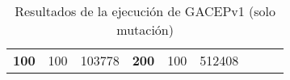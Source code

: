 \begin{table}[H]
\begin{tabular}{|ccrccrccr}
\multicolumn{1}{|c|}{\multirow{-39}{*}{\cellcolor[HTML]{FFFFC7}\textbf{100}}} & \multicolumn{1}{c|}{\multirow{-9}{*}{\cellcolor[HTML]{DDFDFF}100}} & \multicolumn{1}{r|}{\cellcolor[HTML]{DAE8FC}103778}    & \multicolumn{1}{c|}{\multirow{-39}{*}{\cellcolor[HTML]{FFFFC7}\textbf{200}}} & \multicolumn{1}{c|}{\multirow{-10}{*}{\cellcolor[HTML]{DDFDFF}100}} & \multicolumn{1}{r|}{\cellcolor[HTML]{DDFDFF}512408}    &                                                                              &                                                                    &                                                        \\ \cline{1-6}
\end{tabular}
\caption{\label{HistMut}Resultados de la ejecución de GACEPv1 (solo mutación)}
\end{table}

